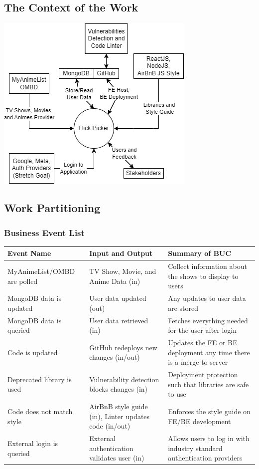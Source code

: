 \documentclass[12pt]{article}
\begin{document}
\subsection{The Context of the Work}
\begin{center}
	\includegraphics[scale=1]{contextDiagram.png}
\end{center}

\subsection{Work Partitioning}
\subsubsection*{Business Event List}
\begin{tabularx}{\textwidth}{|p{4cm}p{6cm}X|}
\toprule {\bf Event Name} & {\bf Input and Output} & {\bf Summary of BUC}\\
\hline
MyAnimeList/OMBD are polled & TV Show, Movie, and Anime Data (in) & Collect information about the shows to display to users \\
\hline
MongoDB data is updated & User data updated (out) & Any updates to user data are stored \\
\hline
MongoDB data is queried & User data retrieved (in) & Fetches everything needed for the user after login \\
\hline
Code is updated & GitHub redeploys new changes (in/out) & Updates the FE or BE deployment any time there is a merge to server \\
\hline
Deprecated library is used & Vulnerability detection blocks changes (in) & Deployment protection such that libraries are safe to use \\
\hline
Code does not match style & AirBnB style guide (in), Linter updates code (in/out) & Enforces the style guide on FE/BE development \\
\hline
External login is queried & External authentication validates user (in) & Allows users to log in with industry standard authentication providers \\
\hline
\end{tabularx}
\end{document}
